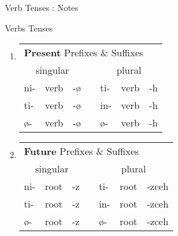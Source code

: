 \documentclass[12pt]{beamer}
\newcommand{\nah}[1]{\textcolor{nahgrn}{#1}}
\newcommand{\trs}[1]{\textcolor{nahblu}{#1}}
\begin{document}
\begin{frame}
\begin{columns}[t]
\begin{column}{.23\linewidth}
\begin{block}{Verb Tenses : Notes}
    		
    	\end{block}
    	\begin{block}{Verbs Tenses}
    		\begin{enumerate}
    			\item \begin{tabular}[t]{lllllll}
    				\multicolumn{7}{l}{\textbf{Present} \nah{Prefixes} \& \trs{Suffixes}}              \\
    				\multicolumn{3}{c}{singular}    & \vline & \multicolumn{3}{c}{plural}     \\
    				\cline{1-7}
    				\nah{ni-}   & verb & \trs{-ø}   & \vline & \nah{ti-}   & verb & \trs{-h}  \\
    				\nah{ti-}   & verb & \trs{-ø}   & \vline & \nah{in-}   & verb & \trs{-h}  \\
    				\nah{ø-}    & verb & \trs{-ø}   & \vline & \nah{ø-}    & verb & \trs{-h}  \\
    			\end{tabular}%
    			\item \begin{tabular}[t]{lllllll}
    				\multicolumn{7}{l}{\textbf{Future} \nah{Prefixes} \& \trs{Suffixes}}       	         \\
    				\multicolumn{3}{c}{singular}    & \vline & \multicolumn{3}{c}{plural}        \\
    				\cline{1-7}
    				\nah{ni-}   & root & \trs{-z}   & \vline & \nah{ti-}   & root & \trs{-zceh}  \\
    				\nah{ti-}   & root & \trs{-z}   & \vline & \nah{in-}   & root & \trs{-zceh}  \\
    				\nah{ø-}    & root & \trs{-z}   & \vline & \nah{ø-}    & root & \trs{-zceh}  \\
    			\end{tabular}%
    		\end{enumerate}
    	\end{block}
    	

\end{column}
\end{columns}
\end{frame}
\end{document}
